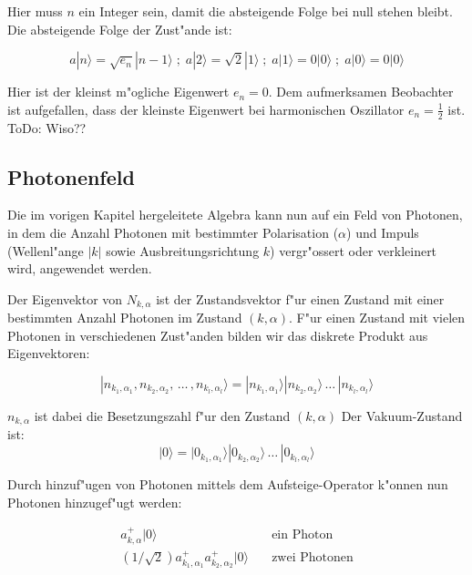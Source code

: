 Hier muss $n$ ein Integer sein, damit die absteigende Folge bei null stehen bleibt. Die absteigende Folge der Zust"ande ist:

\begin{equation}
a|n\rangle = \sqrt{e_n}|n-1\rangle \; ; \; a|2\rangle = \sqrt{2}|1\rangle \; ; \; a|1\rangle = 0|0\rangle \; ; \; a|0\rangle = 0|0\rangle
\end{equation}

Hier ist der kleinst m"ogliche Eigenwert $e_n = 0$. Dem aufmerksamen Beobachter ist aufgefallen, dass der kleinste Eigenwert bei harmonischen Oszillator $e_n = \frac{1}{2}$ ist. ToDo: Wiso??

\subsection{Photonenfeld}

Die im vorigen Kapitel hergeleitete Algebra kann nun auf ein Feld von Photonen, in dem die Anzahl Photonen mit bestimmter Polarisation ($\alpha$) und Impuls (Wellenl"ange $|k|$ sowie Ausbreitungsrichtung $k$) vergr"ossert oder verkleinert wird, angewendet werden.

Der Eigenvektor von $N_{k,\alpha}$ ist der Zustandsvektor f"ur einen Zustand mit einer bestimmten Anzahl Photonen im Zustand $(k,\alpha)$. F"ur einen Zustand mit vielen Photonen in verschiedenen Zust"anden bilden wir das diskrete Produkt aus Eigenvektoren:

\begin{equation}
|n_{k_1,\alpha_1}, n_{k_2,\alpha_2}, \, \hdots \, , n_{k_l,\alpha_l}\rangle = |n_{k_1,\alpha_1}\rangle |n_{k_2,\alpha_2}\rangle \, \hdots \, |n_{k_l,\alpha_l}\rangle
\end{equation}

$n_{k,\alpha}$ ist dabei die Besetzungszahl f"ur den Zustand $(k,\alpha)$ Der Vakuum-Zustand ist:
\begin{equation}
|0\rangle = |0_{k_1,\alpha_1}\rangle |0_{k_2,\alpha_2}\rangle \, \hdots \, |0_{k_l,\alpha_l}\rangle
\end{equation}

Durch hinzuf"ugen von Photonen mittels dem Aufsteige-Operator k"onnen nun Photonen hinzugef"ugt werden:

\begin{equation}
\begin{split}
a^+_{k,\alpha}|0\rangle & \quad \text{ein Photon}\\
(1/\sqrt{2})a^+_{k_1,\alpha_1}a^+_{k_2,\alpha_2}|0\rangle & \quad \text{zwei Photonen}\\
\end{split}
\end{equation}

